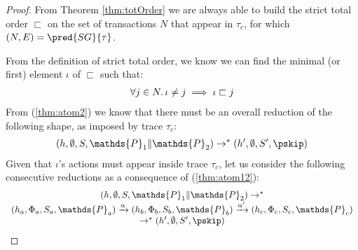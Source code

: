 \begin{thm}
{\begin{proof}
From Theorem \ref{thm:totOrder} we are always able to build the strict total order $\sqsubset$ on the set of transactions $N$ that appear in $\tau_c$, for which $(N, E) = \pred{SG}{\tau}$.

From the definition of strict total order, we know we can find the minimal (or first) element $\iota$ of $\sqsubset$ such that:
\begin{gather}
	\label{thm:atom3} \forall j \in N \ldotp \iota \neq j \implies \iota \sqsubset j
\end{gather}
From (\ref{thm:atom2}) we know that there must be an overall reduction of the following shape, as imposed by trace $\tau_c$:
	\begin{gather}
		\label{thm:atom12}
		(h, \emptyset, S, \mathds{P}_1 \| \mathds{P}_2) \rightarrow^* (h', \emptyset, S', \pskip)
	\end{gather}
Given that $\iota$'s actions must appear inside trace $\tau_c$, let us consider the following consecutive reductions as a consequence of (\ref{thm:atom12}):
\begin{gather}
	\label{thm:atom14}
	\begin{array}{c}
		(h, \emptyset, S, \mathds{P}_1 \| \mathds{P}_2)
			\rightarrow^* \\
		(h_a, \Phi_a, S_a, \mathds{P}_a)
			\xrightarrow{\alpha}
		(h_b, \Phi_b, S_b, \mathds{P}_b)
			\xrightarrow{\alpha'}
		(h_c, \Phi_c, S_c, \mathds{P}_c) \\
			\rightarrow^*
		(h', \emptyset, S', \pskip)
	\end{array}
\end{gather}
	

\end{proof}}
\end{thm}
